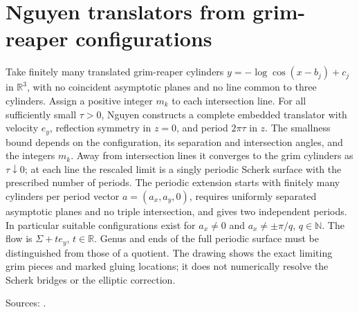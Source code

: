 \chapter{Nguyen translators from grim-reaper configurations}\label{sec:catalogue-nguyen-grim-configurations}
\begin{example}\label{ex:catalogue-nguyen-grim-configurations}
Take finitely many translated grim-reaper cylinders $y=-\log\cos(x-b_j)+c_j$ in $\mathbb R^3$, with no coincident asymptotic planes and no line common to three cylinders. Assign a positive integer $m_k$ to each intersection line. For all sufficiently small $\tau>0$, Nguyen constructs a complete embedded translator with velocity $e_y$, reflection symmetry in $z=0$, and period $2\pi\tau$ in $z$. The smallness bound depends on the configuration, its separation and intersection angles, and the integers $m_k$. Away from intersection lines it converges to the grim cylinders as $\tau\downarrow0$; at each line the rescaled limit is a singly periodic Scherk surface with the prescribed number of periods.
The periodic extension starts with finitely many cylinders per period vector $a=(a_x,a_y,0)$, requires uniformly separated asymptotic planes and no triple intersection, and gives two independent periods. In particular suitable configurations exist for $a_x\ne0$ and $a_x\ne\pm\pi/q$, $q\in\mathbb N$. The flow is $\Sigma+te_y$, $t\in\mathbb R$. Genus and ends of the full periodic surface must be distinguished from those of a quotient. The drawing shows the exact limiting grim pieces and marked gluing locations; it does not numerically resolve the Scherk bridges or the elliptic correction.
\par Sources: \cite{CatNguyen2013,CatNguyen2015}.
\end{example}

